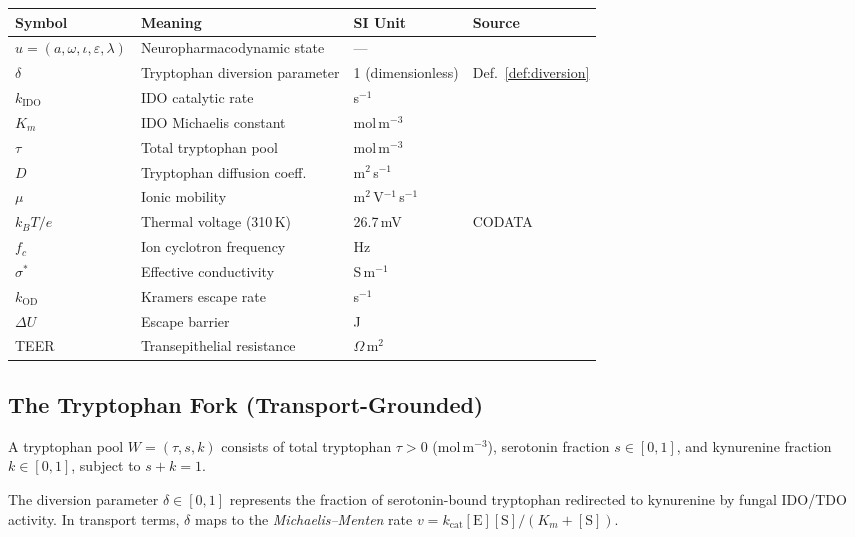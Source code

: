 \begin{center}
\begin{tabular}{@{}llll@{}}
\toprule
Symbol & Meaning & SI Unit & Source \\
\midrule
$u = (a,\omega,\iota,\varepsilon,\lambda)$ & Neuropharmacodynamic state & --- & \cite{lc} \\
$\delta$ & Tryptophan diversion parameter & 1 (dimensionless) & Def.~\ref{def:diversion} \\
$k_\mathrm{IDO}$ & IDO catalytic rate & s$^{-1}$ & \cite{sono96} \\
$K_m$ & IDO Michaelis constant & mol\,m$^{-3}$ & \cite{sono96} \\
$\tau$ & Total tryptophan pool & mol\,m$^{-3}$ & \cite{fernstrom71} \\
$D$ & Tryptophan diffusion coeff. & m$^2$\,s$^{-1}$ & \cite{rj2} \\
$\mu$ & Ionic mobility & m$^2$\,V$^{-1}$\,s$^{-1}$ & \cite{rj2} \\
$k_B T/e$ & Thermal voltage (310\,K) & 26.7\,mV & CODATA \\
$f_c$ & Ion cyclotron frequency & Hz & \cite{rj2,rja} \\
$\sigma^*$ & Effective conductivity & S\,m$^{-1}$ & \cite{rj2,rja} \\
$k_\mathrm{OD}$ & Kramers escape rate & s$^{-1}$ & \cite{rj2} \\
$\Delta U$ & Escape barrier & J & \cite{rj2} \\
TEER & Transepithelial resistance & $\Omega$\,m$^2$ & \cite{srinivasan15} \\
\bottomrule
\end{tabular}
\end{center}

\subsection{The Tryptophan Fork (Transport-Grounded)}

\begin{definition}
A tryptophan pool $W = (\tau, s, k)$ consists of total tryptophan
$\tau > 0$ (mol\,m$^{-3}$), serotonin fraction $s \in [0,1]$, and
kynurenine fraction $k \in [0,1]$, subject to $s + k = 1$.
\end{definition}

\begin{definition}
\label{def:diversion}
The diversion parameter $\delta \in [0,1]$ represents the fraction of
serotonin-bound tryptophan redirected to kynurenine by fungal IDO/TDO
activity. In transport terms, $\delta$ maps to the \emph{Michaelis--Menten}
rate $v = k_\mathrm{cat}[\mathrm{E}][\mathrm{S}]/(K_m + [\mathrm{S}])$.
\end{definition}


